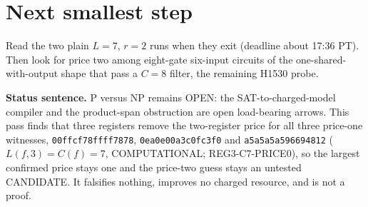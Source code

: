 \documentclass[11pt]{article}
\begin{document}
\section*{Next smallest step}
Read the two plain $L=7$, $r=2$ runs when they exit (deadline about 17:36 PT). Then look for price two among eight-gate six-input circuits of the one-shared-with-output shape that pass a $C=8$ filter, the remaining H1530 probe.

\bigskip
\noindent\textbf{Status sentence.} P versus NP remains OPEN: the SAT-to-charged-model compiler and the product-span obstruction are open load-bearing arrows. This pass finds that three registers remove the two-register price for all three price-one witnesses, \texttt{00ffcf78ffff7878}, \texttt{0ea0e00a3c0fc3f0} and \texttt{a5a5a5a596694812} ($L(f,3)=C(f)=7$, COMPUTATIONAL; REG3-C7-PRICE0), so the largest confirmed price stays one and the price-two guess stays an untested CANDIDATE. It falsifies nothing, improves no charged resource, and is not a proof.
\end{document}
